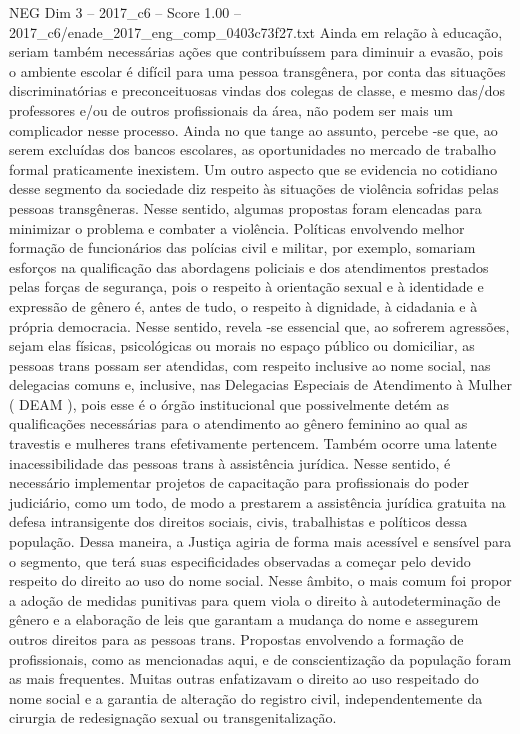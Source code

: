 \begin{textsample}{NEG Dim 3 – 2017\_c6 – Score 1.00 – 2017\_c6/enade\_2017\_eng\_comp\_0403c73f27.txt}
Ainda em relação à educação, seriam também necessárias ações que contribuíssem para diminuir a evasão, pois o ambiente escolar é difícil para uma pessoa transgênera, por conta das situações discriminatórias e preconceituosas vindas dos colegas de classe, e mesmo das/dos professores e/ou de outros profissionais da área, não podem ser mais um complicador nesse processo.
Ainda no que tange ao assunto, percebe -se que, ao serem excluídas dos bancos escolares, as oportunidades no mercado de trabalho formal praticamente inexistem.
Um outro aspecto que se evidencia no cotidiano desse segmento da sociedade diz respeito às situações de violência sofridas pelas pessoas transgêneras.
Nesse sentido, algumas propostas foram elencadas para minimizar o problema e combater a violência.
Políticas envolvendo melhor formação de funcionários das polícias civil e militar, por exemplo, somariam esforços na qualificação das abordagens policiais e dos atendimentos prestados pelas forças de segurança, pois o respeito à orientação sexual e à identidade e expressão de gênero é, antes de tudo, o respeito à dignidade, à cidadania e à própria democracia.
Nesse sentido, revela -se essencial que, ao sofrerem agressões, sejam elas físicas, psicológicas ou morais no espaço público ou domiciliar, as pessoas trans possam ser atendidas, com respeito inclusive ao nome social, nas delegacias comuns e, inclusive, nas Delegacias Especiais de Atendimento à Mulher ( DEAM ), pois esse é o órgão institucional que possivelmente detém as qualificações necessárias para o atendimento ao gênero feminino ao qual as travestis e mulheres trans efetivamente pertencem.
Também ocorre uma latente inacessibilidade das pessoas trans à assistência jurídica.
Nesse sentido, é necessário implementar projetos de capacitação para profissionais do poder judiciário, como um todo, de modo a prestarem a assistência jurídica gratuita na defesa intransigente dos direitos sociais, civis, trabalhistas e políticos dessa população.
Dessa maneira, a Justiça agiria de forma mais acessível e sensível para o segmento, que terá suas especificidades observadas a começar pelo devido respeito do direito ao uso do nome social.
Nesse âmbito, o mais comum foi propor a adoção de medidas punitivas para quem viola o direito à autodeterminação de gênero e a elaboração de leis que garantam a mudança do nome e assegurem outros direitos para as pessoas trans.
Propostas envolvendo a formação de profissionais, como as mencionadas aqui, e de conscientização da população foram as mais frequentes.
Muitas outras enfatizavam o direito ao uso respeitado do nome social e a garantia de alteração do registro civil, independentemente da cirurgia de redesignação sexual ou transgenitalização.

\end{textsample}
